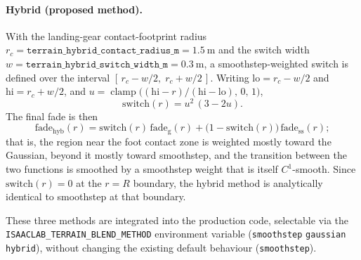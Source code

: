 \paragraph{Hybrid (proposed method).}
With the landing-gear contact-footprint radius $r_{c} =
\texttt{terrain\_hybrid\_contact\_radius\_m} = \SI{1.5}{\metre}$ and the switch
width $w = \texttt{terrain\_hybrid\_switch\_width\_m} = \SI{0.3}{\metre}$, a
smoothstep-weighted switch is defined over the interval $[\,r_{c} - w/2,\;
r_{c} + w/2\,]$. Writing $\mathrm{lo} = r_{c} - w/2$ and $\mathrm{hi} = r_{c} +
w/2$, and $u = \operatorname{clamp}\!\big((\mathrm{hi} - r)/(\mathrm{hi} -
\mathrm{lo}),\, 0,\, 1\big)$,
\begin{equation}
  \mathrm{switch}(r) = u^{2}\,(3 - 2u).
  \label{eq:switch}
\end{equation}
The final fade is then
\begin{equation}
  \mathrm{fade}_{\mathrm{hyb}}(r)
    = \mathrm{switch}(r)\,\mathrm{fade}_{\mathrm{g}}(r)
    + \big(1 - \mathrm{switch}(r)\big)\,\mathrm{fade}_{\mathrm{ss}}(r);
  \label{eq:hybrid}
\end{equation}
that is, the region near the foot contact zone is weighted mostly toward the
Gaussian, beyond it mostly toward smoothstep, and the transition between the
two functions is smoothed by a smoothstep weight that is itself $C^{1}$-smooth.
Since $\mathrm{switch}(r) = 0$ at the $r = R$ boundary, the hybrid method is
analytically identical to smoothstep at that boundary.

These three methods are integrated into the production code, selectable via the
\texttt{ISAACLAB\_TERRAIN\_BLEND\_METHOD} environment variable
(\texttt{smoothstep} \textbar{} \texttt{gaussian} \textbar{} \texttt{hybrid}),
without changing the existing default behaviour (\texttt{smoothstep}).

